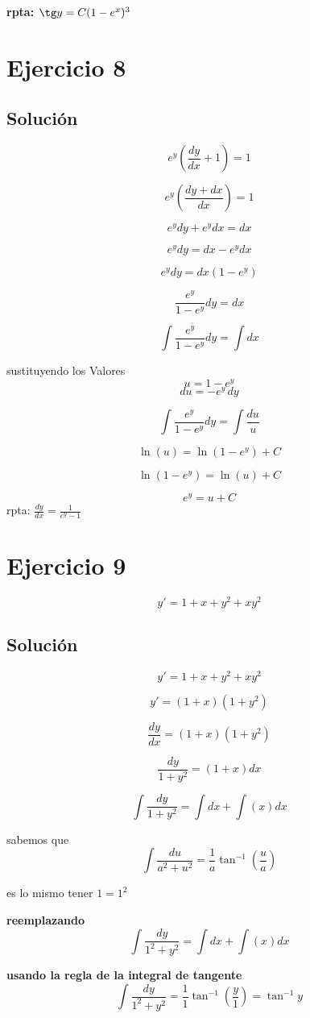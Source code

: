 \documentclass[12pt,a4paper]{article}
\begin{document}
\begin{multicols}{2}
\textbf{rpta: $\tg y=C(1-e^x)^3$}

\section*{Ejercicio 8}
\subsection*{Solución}
\[e^y(\frac{dy}{dx}+1)=1\]

\[e^y\left(\frac{dy +dx}{dx}\right)=1\]

\[e^ydy+e^ydx=dx\]

\[e^ydy=dx-e^ydx\]

\[e^ydy=dx(1-e^y)\]

\[\frac{e^y}{1-e^y}dy=dx\]

\[\int\frac{e^y}{1-e^y}dy=\int dx\]

sustituyendo los Valores \[u=1-e^y\] \[du=-e^y\,dy\] 

\[\int\frac{e^y}{1-e^y}dy=\int\frac{du}{u}\]

\[\ln(u)=\ln(1-e^y)+C\]

\[\ln(1-e^y)=\ln(u)+C\]

\[e^y=u+C\]
rpta: $\frac{dy}{dx}=\frac{1}{e^y-1}$
\section*{Ejercicio 9}

\[y\prime=1+x+y^2+xy^2\]

\subsection*{Solución}
\[y\prime=1+x+y^2+xy^2\]

\[y\prime=(1+x)(1+y^2)\]

\[\frac{dy}{dx}=(1+x)(1+y^2)\]

\[\frac{dy}{1+y^2}=(1+x)dx\]

\[\int\frac{dy}{1+y^2}=\int dx + \int(x)dx\]



sabemos que 
\begin{equation*}
\int\frac{du}{a^2+u^2}=\frac{1}{a}\tan^{-1}\left(\frac{u}{a}\right)
\end{equation*}

es lo mismo tener $1=1^2 $

\textbf{reemplazando}
\[\int\frac{dy}{1^2+y^2}=\int dx + \int(x)dx\]

\textbf{usando la regla de la integral de tangente}
\[\int\frac{dy}{1^2+y^2}=\frac{1}{1}\tan^{-1}\left(\frac{y}{1}\right) = \tan^{-1}y\]


\end{multicols}
\end{document}
